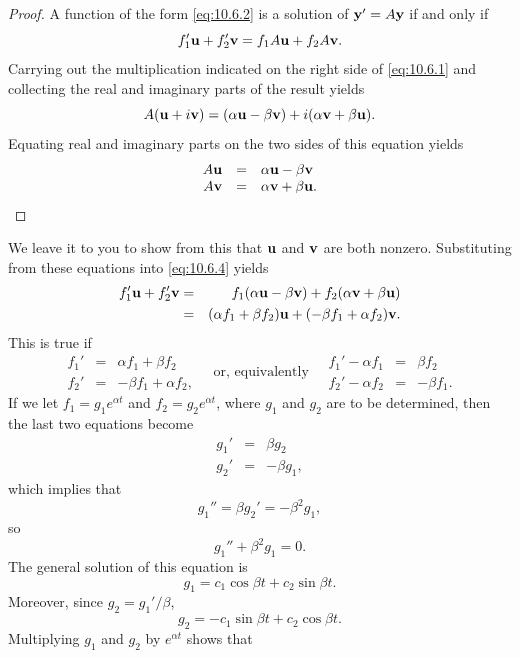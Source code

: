 \documentclass{ximera}
\begin{document}
\begin{proof}
A function of the form \eqref{eq:10.6.2} is a solution of ${\bf y}'=A{\bf
y}$ if and only if
\begin{equation} \label{eq:10.6.4}
f_1'{\bf u}+f_2'{\bf
v}=f_1A{\bf u}+f_2A{\bf v}.
\end{equation}
Carrying out the multiplication indicated on the  right side
of \eqref{eq:10.6.1} and collecting the  real and imaginary parts of the
result yields
$$
A({\bf u}+i{\bf v})=(\alpha{\bf u}-\beta{\bf v})+i(\alpha{\bf v}+\beta{\bf
u}).
$$
Equating real and imaginary parts on the two sides of this equation yields
$$
\begin{array}{rcl}
A{\bf u}&=&\alpha{\bf u}-\beta{\bf v}\\
A{\bf v}&=&\alpha{\bf v}+\beta{\bf u}.
\end{array}
$$
\end{proof}
We leave it to you %
to show from this that
${\bf u}$ and
${\bf v}$ are both nonzero.
Substituting from these equations into \eqref{eq:10.6.4} yields
\begin{eqnarray*}
f_1'{\bf u}+f_2'{\bf v}
&=&f_1(\alpha{\bf u}-\beta{\bf v})+f_2(\alpha{\bf v}+\beta{\bf u})\\
&=&(\alpha f_1+\beta f_2){\bf u}+(-\beta f_1+\alpha f_2){\bf v}.
\end{eqnarray*}
This is true if
$$
\begin{array}{rcr}
f_1'&=&\alpha f_1+\beta f_2\\
f_2'&=&-\beta f_1+\alpha f_2,
\end{array}
\quad\mbox{or, equivalently}\quad
\begin{array}{rcr}
f_1'-\alpha f_1&=&\beta f_2\\
f_2'-\alpha f_2&=&-\beta f_1.
\end{array}
$$
If we let $f_1=g_1e^{\alpha t}$ and $f_2=g_2e^{\alpha t}$, where
$g_1$ and $g_2$ are to be determined, then the last two equations
become
$$
\begin{array}{rcr}
g_1'&=&\beta g_2\\
g_2'&=&-\beta g_1,
\end{array}
$$
which implies that
$$
g_1''=\beta g_2'=-\beta^2 g_1,
$$
so
$$
g_1''+\beta^2 g_1=0.
$$
The general solution of this equation is
$$
g_1=c_1\cos\beta t+c_2\sin\beta t.
$$
Moreover, since $g_2=g_1'/\beta$,
$$
g_2=-c_1\sin\beta t+c_2\cos\beta t.
$$
Multiplying  $g_1$  and $g_2$  by $e^{\alpha t}$ shows that
\end{document}
